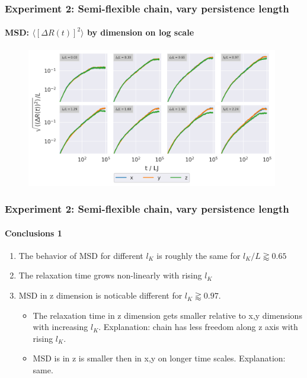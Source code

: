 \documentclass[handout]{beamer}
\newcommand{\mean}[1]{\langle #1 \rangle}
\begin{document}
\begin{frame}
    \frametitle{Experiment 2: Semi-flexible chain, vary persistence length}
    \framesubtitle{MSD: $\mean{[\Delta R(t)]^2}$ by dimension on log scale}

    \begin{figure}[h]
        \includegraphics[width=11cm]{./4-exp-msd_by_dim-log.png}
    \end{figure}
\end{frame}

\begin{frame}
    \frametitle{Experiment 2: Semi-flexible chain, vary persistence length}
    \framesubtitle{Conclusions 1}

    \begin{enumerate}
        \item The behavior of MSD for different $l_K$ is roughly the same for $l_K/L \gtrapprox 0.65$
        \item The relaxation time grows non-linearly with rising $l_K$
        \item MSD in z dimension is noticable different for $l_K \gtrapprox 0.97$. 
        \begin{itemize}
            \item The relaxation time in z dimension gets smaller 
            relative to x,y dimensions with increasing $l_K$. Explanation: chain has less freedom along z axis with rising $l_K$. 
            \item MSD is in z is smaller then in x,y on longer time scales. Explanation: same.
        \end{itemize}
    \end{enumerate}
\end{frame}
\end{document}
